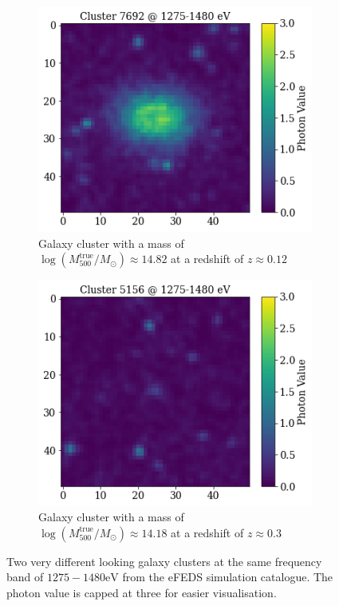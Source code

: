 \begin{figure}[H]
\centering
\begin{subfigure}{.4\textwidth}
  \centering
  \includegraphics[width=\linewidth]{images/Chapter3/cluster_big.png}
  \caption{Galaxy cluster with a mass of $\log{(M_{500}^{\text{true}}/M_{\odot})} \approx 14.82$ at a redshift of $z \approx 0.12$}
  \label{fig:cluster_big}
\end{subfigure}%
\hspace{3.6em}
\begin{subfigure}{.4\textwidth}
  \centering
  \includegraphics[width=\linewidth]{images/Chapter3/cluster_small.png}
  \caption{Galaxy cluster with a mass of $\log{(M_{500}^{\text{true}}/M_{\odot})} \approx 14.18$ at a redshift of $z \approx 0.3$}
  \label{fig:cluster_small}
\end{subfigure}
\caption{Two very different looking galaxy clusters at the same frequency band of $1275-1480 \text{eV}$ from the eFEDS simulation catalogue. The photon value is capped at three for easier visualisation.} 
\label{fig:cluster_comp}
\end{figure}


